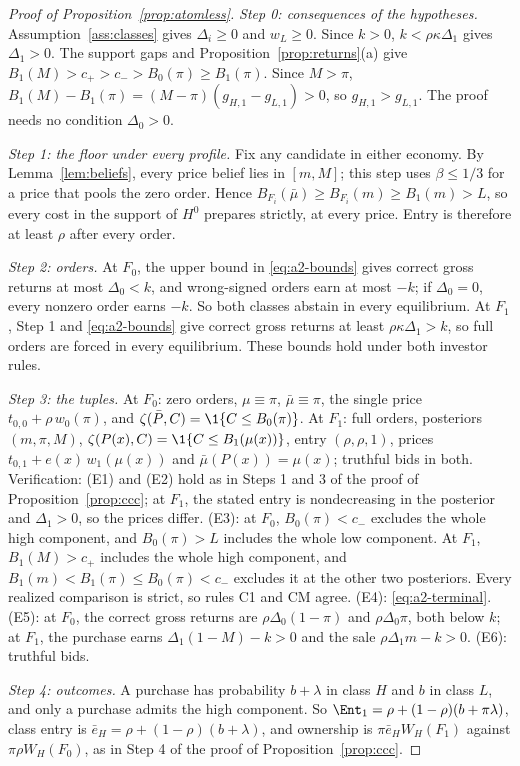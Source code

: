 \begin{proof}[Proof of Proposition~\ref{prop:atomless}]
\emph{Step 0: consequences of the hypotheses.} Assumption~\ref{ass:classes} gives \(\Delta_i\ge0\) and
\(w_L\ge0\). Since \(k>0\), \(k<\rho\kappa\Delta_1\) gives \(\Delta_1>0\). The support gaps and
Proposition~\ref{prop:returns}(a) give \(B_1(M)>c_+>c_->B_0(\pi)\ge B_1(\pi)\). Since \(M>\pi\),
\(B_1(M)-B_1(\pi)=(M-\pi)(g_{H,1}-g_{L,1})>0\), so \(g_{H,1}>g_{L,1}\). The proof needs no condition \(\Delta_0>0\).

\emph{Step 1: the floor under every profile.} Fix any candidate in either economy. By Lemma~\ref{lem:beliefs}, every
price belief lies in \([m,M]\); this step uses \(\beta\le1/3\) for a price that pools the zero order. Hence
\(B_{F_i}(\bar\mu)\ge B_{F_i}(m)\ge B_1(m)>L\), so every cost in the support of \(H^0\) prepares strictly, at every
price. Entry is therefore at least \(\rho\) after every order.

\emph{Step 2: orders.} At \(F_0\), the upper bound in \eqref{eq:a2-bounds} gives correct gross returns at most
\(\Delta_0<k\), and wrong-signed orders earn at most \(-k\); if \(\Delta_0=0\), every nonzero order earns \(-k\). So
both classes abstain in every equilibrium. At \(F_1\), Step 1 and \eqref{eq:a2-bounds} give correct gross returns
at least \(\rho\kappa\Delta_1>k\), so full orders are forced in every equilibrium. These bounds hold under both
investor rules.

\emph{Step 3: the tuples.} At \(F_0\): zero orders, \(\mu\equiv\pi\), \(\bar\mu\equiv\pi\), the single price
\(t_{0,0}+\rho\,w_0(\pi)\), and \(\zeta(\bar P,C)=\1\{C\le B_0(\pi)\}\). At \(F_1\): full orders, posteriors
\((m,\pi,M)\), \(\zeta(P(x),C)=\1\{C\le B_1(\mu(x))\}\), entry \((\rho,\rho,1)\), prices
\(t_{0,1}+e(x)\,w_1(\mu(x))\) and \(\bar\mu(P(x))=\mu(x)\); truthful bids in both. Verification: (E1) and (E2) hold as
in Steps 1 and 3 of the proof of Proposition~\ref{prop:ccc}; at \(F_1\), the stated entry is nondecreasing in the
posterior and \(\Delta_1>0\), so the prices differ. (E3): at \(F_0\), \(B_0(\pi)<c_-\) excludes the whole high
component, and \(B_0(\pi)>L\) includes the whole low component. At \(F_1\), \(B_1(M)>c_+\) includes the whole high
component, and \(B_1(m)<B_1(\pi)\le B_0(\pi)<c_-\) excludes it at the other two posteriors. Every realized
comparison is strict, so rules C1 and CM agree. (E4): \eqref{eq:a2-terminal}. (E5): at \(F_0\), the correct gross
returns are \(\rho\Delta_0(1-\pi)\) and \(\rho\Delta_0\pi\), both below \(k\); at \(F_1\), the purchase earns
\(\Delta_1(1-M)-k>0\) and the sale \(\rho\Delta_1m-k>0\). (E6): truthful bids.

\emph{Step 4: outcomes.} A purchase has probability \(b+\lambda\) in class \(H\) and \(b\) in class \(L\), and only
a purchase admits the high component. So \(\Ent_1=\rho+(1-\rho)(b+\pi\lambda)\), class entry is
\(\bar e_H=\rho+(1-\rho)(b+\lambda)\), and ownership is \(\pi\bar e_HW_H(F_1)\) against \(\pi\rho W_H(F_0)\), as in
Step 4 of the proof of Proposition~\ref{prop:ccc}.
\end{proof}

